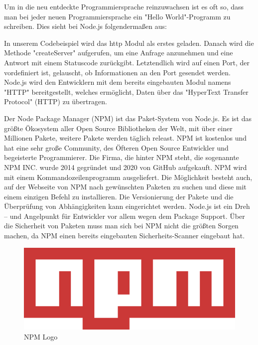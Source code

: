 \cite{Anwendungen}



Um in die neu entdeckte Programmiersprache reinzuwachsen ist es oft so, dass man bei jeder neuen Programmiersprache ein "Hello World"-Programm zu schreiben. Dies sieht bei Node.js folgendermaßen aus:


In unserem Codebeispiel wird das http Modul als erstes geladen. Danach wird die Methode "createServer" aufgerufen, um eine Anfrage anzunehmen und eine Antwort mit einem Statuscode zurückgibt. Letztendlich wird auf einen Port, der vordefiniert ist, gelauscht, ob Informationen an den Port gesendet werden.
Node.js wird den Entwicklern mit dem bereits eingebauten Modul namens "HTTP" bereitgestellt, welches ermöglicht, Daten über das "HyperText Transfer Protocol" (HTTP) zu übertragen. \cite{HelloWorld}


Der Node Package Manager (NPM) ist das Paket-System von Node.js. Es ist das größte Ökosystem aller Open Source Bibliotheken der Welt, mit über einer Millionen Pakete, weitere Pakete werden täglich releast. NPM ist kostenlos und hat eine sehr große Community, des Öfteren Open Source Entwickler und begeisterte Programmierer. Die Firma, die hinter NPM steht, die sogenannte NPM INC. wurde 2014 gegründet und 2020 von GitHub aufgekauft.
NPM wird mit einem Kommandozeilenprogramm ausgeliefert. Die Möglichkeit besteht auch, auf der Webseite von NPM nach gewünschten Paketen zu suchen und diese mit einem einzigen Befehl zu installieren. Die Versionierung der Pakete und die Überprüfung von Abhängigkeiten kann eingerichtet werden. Node.js ist ein Dreh – und Angelpunkt für Entwickler vor allem wegen dem Package Support.
Über die Sicherheit von Paketen muss man sich bei NPM nicht die größten Sorgen machen, da NPM einen bereits eingebauten Sicherheits-Scanner eingebaut hat. \cite{NPM} \cite{NPM2}

\begin{figure}[H]
    \centering
    \includegraphics{media/NodeJs/NPM.png}
    \caption{NPM Logo}
\end{figure}